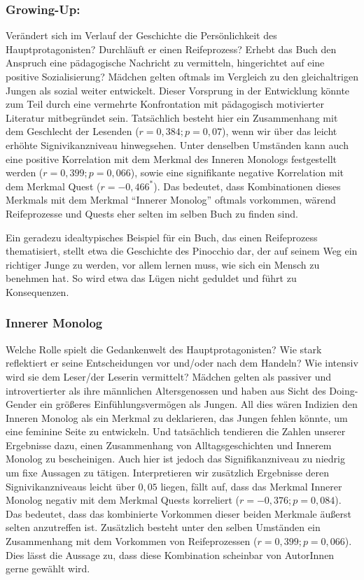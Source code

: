 \subsubsection{Growing-Up:}

Verändert sich im Verlauf der Geschichte die Persönlichkeit des
Hauptprotagonisten? Durchläuft er einen Reifeprozess? Erhebt das Buch
den Anspruch eine pädagogische Nachricht zu vermitteln, hingerichtet auf
eine positive Sozialisierung? Mädchen gelten oftmals im Vergleich zu den
gleichaltrigen Jungen als sozial weiter entwickelt. Dieser Vorsprung in
der Entwicklung könnte zum Teil durch eine vermehrte Konfrontation mit
pädagogisch motivierter Literatur mitbegründet sein. Tatsächlich besteht
hier ein Zusammenhang mit dem Geschlecht der Lesenden
($r= 0{,}384; p= 0{,}07$), wenn wir über das leicht erhöhte
Signivikanzniveau hinwegsehen. Unter denselben Umständen kann auch eine
positive Korrelation mit dem Merkmal des Inneren Monologs festgestellt
werden ($r= 0{,}399; p= 0{,}066$), sowie eine signifikante negative
Korrelation mit dem Merkmal Quest ($r= -0{,}466^*$). Das bedeutet, dass
Kombinationen dieses Merkmals mit dem Merkmal ``Innerer Monolog''
oftmals vorkommen, wärend Reifeprozesse und Quests eher selten im selben
Buch zu finden sind.

Ein geradezu idealtypisches Beispiel für ein Buch, das einen
Reifeprozess thematisiert, stellt etwa die Geschichte des Pinocchio dar,
der auf seinem Weg ein richtiger Junge zu werden, vor allem lernen muss,
wie sich ein Mensch zu benehmen hat. So wird etwa das Lügen nicht
geduldet und führt zu Konsequenzen.

\subsubsection{Innerer Monolog}

Welche Rolle spielt die Gedankenwelt des Hauptprotagonisten? Wie stark
reflektiert er seine Entscheidungen vor und/oder nach dem Handeln? Wie
intensiv wird sie dem Leser/der Leserin vermittelt? Mädchen gelten als
passiver und introvertierter als ihre männlichen Altersgenossen und
haben aus Sicht des Doing-Gender ein größeres Einfühlungsvermögen als
Jungen. All dies wären Indizien den Inneren Monolog als ein Merkmal zu
deklarieren, das Jungen fehlen könnte, um eine feminine Seite zu
entwickeln. Und tatsächlich tendieren die Zahlen unserer Ergebnisse
dazu, einen Zusammenhang von Alltagsgeschichten und Innerem Monolog zu
bescheinigen. Auch hier ist jedoch das Signifikanzniveau zu niedrig um
fixe Aussagen zu tätigen. Interpretieren wir zusätzlich Ergebnisse deren
Signivikanzniveaus leicht über $0{,}05$ liegen, fällt auf, dass das
Merkmal Innerer Monolog negativ mit dem Merkmal Quests korreliert
($r= -0{,}376; p= 0{,}084$). Das bedeutet, dass das kombinierte
Vorkommen dieser beiden Merkmale äußerst selten anzutreffen ist.
Zusätzlich besteht unter den selben Umständen ein Zusammenhang mit dem
Vorkommen von Reifeprozessen ($r= 0{,}399; p= 0{,}066$). Dies lässt die
Aussage zu, dass diese Kombination scheinbar von AutorInnen gerne
gewählt wird.

